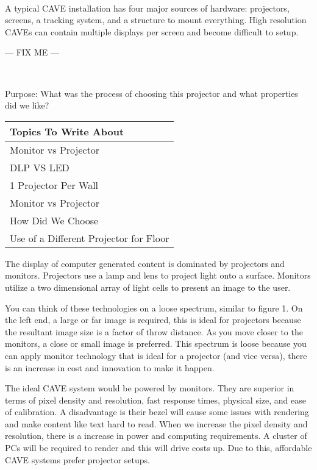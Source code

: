 \label{chapter:hardwareChapter}

\\

A typical CAVE installation has four major sources of hardware: projectors, screens, a tracking system, and a structure to mount everything. High resolution CAVEs can contain multiple displays per screen and become difficult to setup.

--- FIX ME ---


\label{sec:hwProjectorsSection}\\
\begin{center}
	\textcolor{OliveGreen}{Purpose: What was the process of choosing this projector and what properties did we like?}
	
	\begin{table}[H]
		\centering
		\renewcommand\arraystretch{0.5}
		\begin{tabular}{|l|}
			\hline 
			Topics To Write About \\ 
			\hline 
			Monitor vs Projector \\
			DLP VS LED \\  
			1 Projector Per Wall \\ 
			Monitor vs Projector \\ 
			How Did We Choose  \\ 
			Use of a Different Projector for Floor  \\ 
			\hline 
		\end{tabular}
	\end{table}
\end{center}

The display of computer generated content is dominated by projectors and monitors. Projectors use a lamp and lens to project light onto a surface. Monitors utilize a two dimensional array of light cells to present an image to the user.

You can think of these technologies on a loose spectrum, similar to figure 1. On the left end, a large or far image is required, this is ideal for projectors because the resultant image size is a factor of throw distance. As you move closer to the monitors, a close or small image is preferred. This spectrum is loose because you can apply monitor technology that is ideal for a projector (and vice versa), there is an increase in cost and innovation to make it happen.

The ideal CAVE system would be powered by monitors. They are superior in terms of pixel density and resolution, fast response times, physical size, and ease of calibration. A disadvantage is their bezel will cause some issues with rendering and make content like text hard to read. When we increase the pixel density and resolution, there is a increase in power and computing requirements. A cluster of PCs will be required to render and this will drive costs up. Due to this, affordable CAVE systems prefer projector setups.

